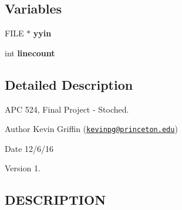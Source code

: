 \subsection*{Variables}
\begin{DoxyCompactItemize}
\item 
\mbox{\label{parser_8y_a46af646807e0797e72b6e8945e7ea88b}} 
F\+I\+LE $\ast$ {\bfseries yyin}
\item 
\mbox{\label{parser_8y_acf994a7eb23510cbc352de057d2f8a83}} 
int {\bfseries linecount}
\end{DoxyCompactItemize}


\subsection{Detailed Description}
A\+PC 524, Final Project -\/ Stoched. 

\begin{DoxyAuthor}{Author}
Kevin Griffin (\href{mailto:kevinpg@princeton.edu}{\tt kevinpg@princeton.\+edu}) 
\end{DoxyAuthor}
\begin{DoxyDate}{Date}
12/6/16 
\end{DoxyDate}
\begin{DoxyVersion}{Version}
1.
\end{DoxyVersion}
\hypertarget{event.cc_DESCRIPTION}{}\subsection{D\+E\+S\+C\+R\+I\+P\+T\+I\+ON}\label{event.cc_DESCRIPTION}
